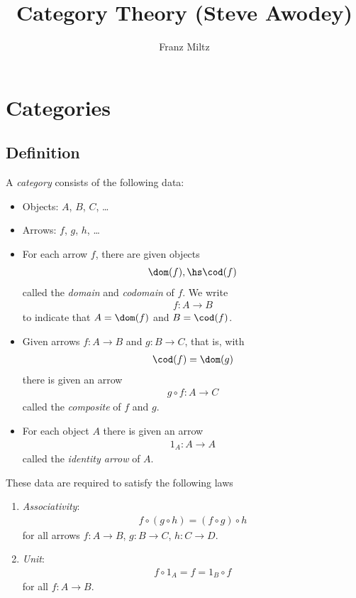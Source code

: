 \documentclass{article}
\begin{document}
\mkawodeythms
\title{Category Theory (Steve Awodey)}
\author{Franz Miltz}
\maketitle
\tableofcontents
\pagebreak

\section{Categories}

\subsection{Definition}

\begin{definition}[Category]
    A \emph{category} consists of the following data:
    \begin{itemize}
        \item Objects: $A$, $B$, $C$, \dots
        \item Arrows: $f$, $g$, $h$, \dots
        \item For each arrow $f$, there are given objects \begin{align*}
            \dom(f),\hs \cod(f)
        \end{align*}
        called the \emph{domain} and \emph{codomain} of $f$. We write
        \begin{align*}
            f:A\to B
        \end{align*}
        to indicate that $A=\dom(f)$ and $B=\cod(f)$.
        \item Given arrows $f:A\to B$ and $g:B\to C$, that is, with \begin{align*}
            \cod(f) = \dom(g)
        \end{align*}
        there is given an arrow
        \begin{align*}
            g\circ f: A\to C
        \end{align*}
        called the \emph{composite} of $f$ and $g$.
        \item For each object $A$ there is given an arrow \begin{align*}
            1_A : A\to A
        \end{align*}
        called the \emph{identity arrow} of $A$.
    \end{itemize}
    These data are required to satisfy the following laws \begin{enumerate}[label=C\arabic*.]
        \item \emph{Associativity}: \begin{align*}
            f \circ (g \circ h) = (f\circ g) \circ h
        \end{align*}
        for all arrows $f:A\to B$, $g:B\to C$, $h:C\to D$.
        \item \emph{Unit}: \begin{align*}
            f \circ 1_A = f = 1_B \circ f
        \end{align*}
        for all $f:A\to B$.
    \end{enumerate}
\end{definition}
\end{document}
